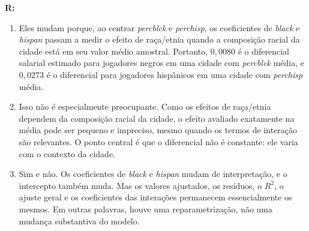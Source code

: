 \documentclass[12pt,letterpaper, onecolumn]{exam}
\renewenvironment{solution}
{\par\noindent\textbf{R:}\enspace\color{blue}}
{\par\color{black}}
\begin{document}
\begin{questions}
\begin{solution}
\begin{enumerate}[label=(\roman*)]
    \item Eles mudam porque, ao centrar \textit{percblck} e \textit{perchisp}, os coeficientes de \textit{black} e \textit{hispan} passam a medir o efeito de raça/etnia quando a composição racial da cidade está em seu valor médio amostral. Portanto, \(0{,}0080\) é o diferencial salarial estimado para jogadores negros em uma cidade com \textit{percblck} média, e \(0{,}0273\) é o diferencial para jogadores hispânicos em uma cidade com \textit{perchisp} média.

    \item Isso não é especialmente preocupante. Como os efeitos de raça/etnia dependem da composição racial da cidade, o efeito avaliado exatamente na média pode ser pequeno e impreciso, mesmo quando os termos de interação são relevantes. O ponto central é que o diferencial não é constante: ele varia com o contexto da cidade.

    \item Sim e não. Os coeficientes de \textit{black} e \textit{hispan} mudam de interpretação, e o intercepto também muda. Mas os valores ajustados, os resíduos, o \(R^2\), o ajuste geral e os coeficientes das interações permanecem essencialmente os mesmos. Em outras palavras, houve uma reparametrização, não uma mudança substantiva do modelo.
\end{enumerate}
\end{solution}

\vspace{0.7cm}


\end{questions}
\end{document}
